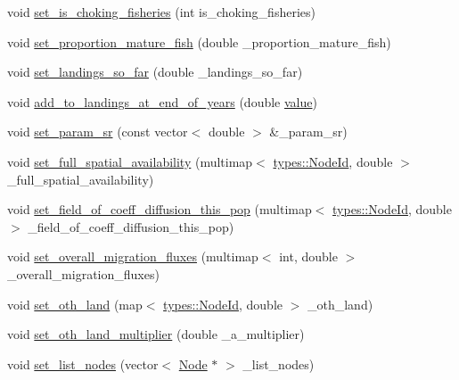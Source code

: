 \begin{DoxyCompactItemize}
\item 
void \mbox{\hyperlink{class_population_a4b67e1bdf4faa2f7bd139ea7192a2223}{set\+\_\+is\+\_\+choking\+\_\+fisheries}} (int is\+\_\+choking\+\_\+fisheries)
\item 
void \mbox{\hyperlink{class_population_a89e01ecdc70dc056b177e9fddf97fd97}{set\+\_\+proportion\+\_\+mature\+\_\+fish}} (double \+\_\+proportion\+\_\+mature\+\_\+fish)
\item 
void \mbox{\hyperlink{class_population_ab72ccfca22cb62d0cc71771250b1f5f7}{set\+\_\+landings\+\_\+so\+\_\+far}} (double \+\_\+landings\+\_\+so\+\_\+far)
\item 
void \mbox{\hyperlink{class_population_aa86257dc84558f3506c013d9279eee73}{add\+\_\+to\+\_\+landings\+\_\+at\+\_\+end\+\_\+of\+\_\+years}} (double \mbox{\hyperlink{diffusion_8cpp_a4b41795815d9f3d03abfc739e666d5da}{value}})
\item 
void \mbox{\hyperlink{class_population_a1053e532a1864da186cf4e7648dbe969}{set\+\_\+param\+\_\+sr}} (const vector$<$ double $>$ \&\+\_\+param\+\_\+sr)
\item 
void \mbox{\hyperlink{class_population_ad994160916721d5d96c33a4db702e90b}{set\+\_\+full\+\_\+spatial\+\_\+availability}} (multimap$<$ \mbox{\hyperlink{classtypes_1_1_node_id}{types\+::\+Node\+Id}}, double $>$ \+\_\+full\+\_\+spatial\+\_\+availability)
\item 
void \mbox{\hyperlink{class_population_a1db1433c65156a90fc910bb11e5cdcca}{set\+\_\+field\+\_\+of\+\_\+coeff\+\_\+diffusion\+\_\+this\+\_\+pop}} (multimap$<$ \mbox{\hyperlink{classtypes_1_1_node_id}{types\+::\+Node\+Id}}, double $>$ \+\_\+field\+\_\+of\+\_\+coeff\+\_\+diffusion\+\_\+this\+\_\+pop)
\item 
void \mbox{\hyperlink{class_population_a73f27952336c2f075a51f6be3c48e9ae}{set\+\_\+overall\+\_\+migration\+\_\+fluxes}} (multimap$<$ int, double $>$ \+\_\+overall\+\_\+migration\+\_\+fluxes)
\item 
void \mbox{\hyperlink{class_population_a4cb661707a980ccb2ce2762af6028ecd}{set\+\_\+oth\+\_\+land}} (map$<$ \mbox{\hyperlink{classtypes_1_1_node_id}{types\+::\+Node\+Id}}, double $>$ \+\_\+oth\+\_\+land)
\item 
void \mbox{\hyperlink{class_population_a6fa5538be71c4a81a2810d19c454f872}{set\+\_\+oth\+\_\+land\+\_\+multiplier}} (double \+\_\+a\+\_\+multiplier)
\item 
void \mbox{\hyperlink{class_population_afb8707dda108ce991159066714b4466c}{set\+\_\+list\+\_\+nodes}} (vector$<$ \mbox{\hyperlink{class_node}{Node}} $\ast$ $>$ \+\_\+list\+\_\+nodes)

\end{DoxyCompactItemize}
